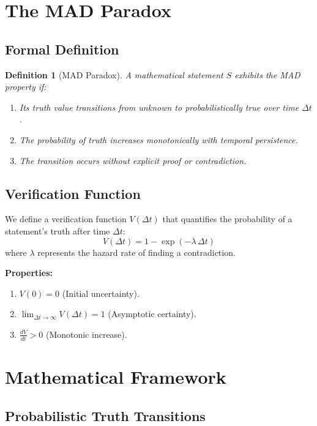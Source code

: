 \documentclass[11pt]{article}
\newtheorem{definition}{Definition}[section]
\begin{document}
\section{The MAD Paradox}

\subsection{Formal Definition}

\begin{definition}[MAD Paradox]
A mathematical statement $S$ exhibits the MAD property if:
\begin{enumerate}[label=(\arabic*)]
    \item Its truth value transitions from unknown to probabilistically true over time $\Delta t$.
    \item The probability of truth increases monotonically with temporal persistence.
    \item The transition occurs without explicit proof or contradiction.
\end{enumerate}
\end{definition}

\subsection{Verification Function}

We define a verification function $V(\Delta t)$ that quantifies the probability of a statement's truth after time $\Delta t$:
\[
V(\Delta t) = 1 - \exp(-\lambda\,\Delta t)
\]
where $\lambda$ represents the hazard rate of finding a contradiction.

\noindent\textbf{Properties:}
\begin{enumerate}[label=(\alph*)]
    \item $V(0) = 0$ (Initial uncertainty).
    \item $\displaystyle \lim_{\Delta t\to\infty} V(\Delta t) = 1$ (Asymptotic certainty).
    \item $\displaystyle \frac{dV}{dt} > 0$ (Monotonic increase).
\end{enumerate}

\section{Mathematical Framework}

\subsection{Probabilistic Truth Transitions}
\end{document}
